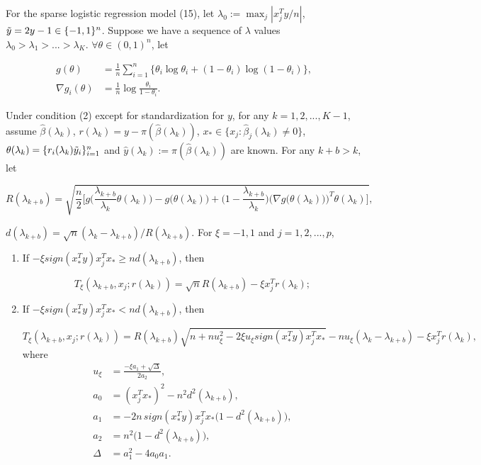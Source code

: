 \begin{theorem}
For the sparse logistic regression model (15), let $\lambda_0:=\max_j|x_j^Ty/n|$, $\Tilde{y}=2y-1\in\{-1,1\}^n$. Suppose we have a sequence of $\lambda$ values $\lambda_0>\lambda_1>...>\lambda_K$. $\forall\theta\in(0,1)^n$, let 

\begin{equation}
    \begin{split}
        g(\theta)&=\frac{1}{n}\sum_{i=1}^n\{\theta_i\log \theta_i+(1-\theta_i)\log(1-\theta_i)\},\\
    \nabla g_i(\theta) &= \frac{1}{n}\log\frac{\theta_i}{1-\theta_i}.
    \end{split}
\end{equation}

Under condition (2) except for standardization for $y$, for any $k=1,2,...,K-1$, assume $\hat{\beta}(\lambda_k)$, $r(\lambda_k)=y-\pi(\hat{\beta}(\lambda_k))$, $x_*\in\{x_j:\hat{\beta}_j(\lambda_k)\neq0\} $, $\theta(\lambda_k)=\{r_i(\lambda_k)\Tilde{y}_i\}_{i=1}^n$ and $\hat{y}(\lambda_k):=\pi(\hat{\beta}(\lambda_k))$ are known. For any $k+b>k$, let

\begin{equation}
    R(\lambda_{k+b})=\sqrt{\frac{n}{2}\bigg[g\bigg(\frac{\lambda_{k+b}}{\lambda_k}\theta(\lambda_k)\bigg)-g\bigg(\theta(\lambda_k)\bigg)+\bigg(1-\frac{\lambda_{k+b}}{\lambda_k}\bigg)\bigg(\nabla g\big(\theta(\lambda_k)\big)\bigg)^T\theta(\lambda_k)\bigg]},
\end{equation}

$d(\lambda_{k+b})=\sqrt{n}(\lambda_k-\lambda_{k+b})/R(\lambda_{k+b})$. For $\xi = -1,1$ and $j=1,2,...,p$,

\begin{enumerate}
    \item If $-\xi sign(x_*^Ty)x_j^Tx_*\geq nd(\lambda_{k+b})$, then
    
    \begin{equation}
        T_\xi(\lambda_{k+b},x_j;r(\lambda_k))=\sqrt{n}R(\lambda_{k+b})-\xi x_j^Tr(\lambda_k);
    \end{equation}
    
    \item If $-\xi sign(x_*^Ty)x_j^Tx_*< nd(\lambda_{k+b})$, then
    
    \begin{equation}
        T_\xi(\lambda_{k+b},x_j;r(\lambda_k))=R(\lambda_{k+b})\sqrt{n+nu_\xi^2-2\xi u_\xi sign(x_*^Ty)x_j^Tx_*}-nu_\xi(\lambda_k-\lambda_{k+b})-\xi x_j^Tr(\lambda_k),
    \end{equation}
    where
    \begin{align}
        u_\xi&=\frac{-\xi a_1+\sqrt{\Delta}}{2a_2},\\
        a_0&=(x_j^Tx_*)^2-n^2d^2(\lambda_{k+b}),\nonumber\\
        a_1&=-2n\,sign(x_*^Ty)x_j^Tx_*\big(1-d^2(\lambda_{k+b})\big),\nonumber\\
        a_2&=n^2\big(1-d^2(\lambda_{k+b})\big),\nonumber\\
        \Delta&=a_1^2-4a_0a_1.\nonumber
    \end{align}
\end{enumerate}


\end{theorem}
